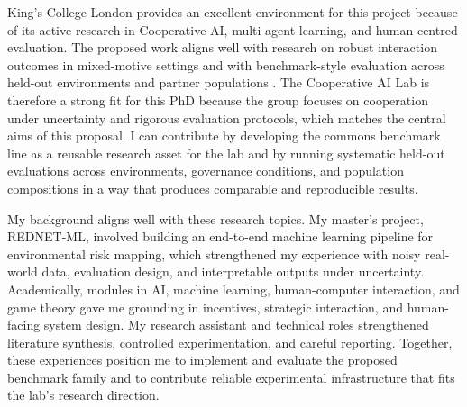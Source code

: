 \documentclass[10pt]{article}
\begin{document}
King's College London provides an excellent environment for this project because of its active research in Cooperative AI, multi-agent learning, and human-centred evaluation. The proposed work aligns well with research on robust interaction outcomes in mixed-motive settings and with benchmark-style evaluation across held-out environments and partner populations \citep{meltingpot2021, socialjax2025}. The Cooperative AI Lab is therefore a strong fit for this PhD because the group focuses on cooperation under uncertainty and rigorous evaluation protocols, which matches the central aims of this proposal. I can contribute by developing the commons benchmark line as a reusable research asset for the lab and by running systematic held-out evaluations across environments, governance conditions, and population compositions in a way that produces comparable and reproducible results.

My background aligns well with these research topics. My master's project, REDNET-ML, involved building an end-to-end machine learning pipeline for environmental risk mapping, which strengthened my experience with noisy real-world data, evaluation design, and interpretable outputs under uncertainty. Academically, modules in AI, machine learning, human-computer interaction, and game theory gave me grounding in incentives, strategic interaction, and human-facing system design. My research assistant and technical roles strengthened literature synthesis, controlled experimentation, and careful reporting. Together, these experiences position me to implement and evaluate the proposed benchmark family and to contribute reliable experimental infrastructure that fits the lab's research direction.
\end{document}
